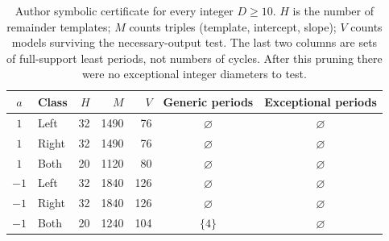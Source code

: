 \begin{table}[tb]
\centering
\caption{Author symbolic certificate for every integer $D\ge10$.
$H$ is the number of remainder templates; $M$ counts triples
(template, intercept, slope); $V$ counts models surviving the
necessary-output test. The last two columns are sets of full-support
least periods, not numbers of cycles. After this pruning there
were no exceptional integer diameters to test.}
\label{tab:largeauthor}
\small
\begin{tabular}{@{}clrrrcc@{}}
\toprule
$a$ & Class & $H$ & $M$ & $V$ & Generic periods & Exceptional periods\\
\midrule
$1$ & Left & 32 & 1490 & 76 & $\varnothing$ & $\varnothing$\\
$1$ & Right & 32 & 1490 & 76 & $\varnothing$ & $\varnothing$\\
$1$ & Both & 20 & 1120 & 80 & $\varnothing$ & $\varnothing$\\
$-1$ & Left & 32 & 1840 & 126 & $\varnothing$ & $\varnothing$\\
$-1$ & Right & 32 & 1840 & 126 & $\varnothing$ & $\varnothing$\\
$-1$ & Both & 20 & 1240 & 104 & $\{4\}$ & $\varnothing$\\
\bottomrule
\end{tabular}
\end{table}
